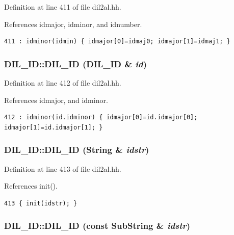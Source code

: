 Definition at line 411 of file dil2al.hh.

References idmajor, idminor, and idnumber.



\footnotesize\begin{verbatim}411 : idminor(idmin) { idmajor[0]=idmaj0; idmajor[1]=idmaj1; }
\end{verbatim}\normalsize 
{}
\subsubsection{\setlength{\rightskip}{0pt plus 5cm}DIL\_\-ID::DIL\_\-ID (DIL\_\-ID \& {\em id})\hspace{0.3cm}{\tt  [inline]}}\label{classDIL__ID_a2}




Definition at line 412 of file dil2al.hh.

References idmajor, and idminor.



\footnotesize\begin{verbatim}412 : idminor(id.idminor) { idmajor[0]=id.idmajor[0]; idmajor[1]=id.idmajor[1]; }
\end{verbatim}\normalsize 
{}
\subsubsection{\setlength{\rightskip}{0pt plus 5cm}DIL\_\-ID::DIL\_\-ID ({\bf String} \& {\em idstr})\hspace{0.3cm}{\tt  [inline]}}\label{classDIL__ID_a3}




Definition at line 413 of file dil2al.hh.

References init().



\footnotesize\begin{verbatim}413 { init(idstr); }
\end{verbatim}\normalsize 
{}
\subsubsection{\setlength{\rightskip}{0pt plus 5cm}DIL\_\-ID::DIL\_\-ID (const {\bf Sub\-String} \& {\em idstr})\hspace{0.3cm}{\tt  [inline]}}\label{classDIL__ID_a4}




